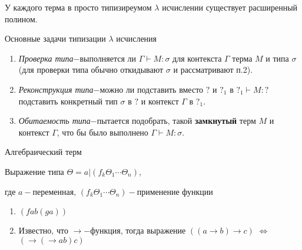 	\begin{theorem}
	У каждого терма в просто типизиреумом $\lambda$ исчислении существует расширенный полином.
	\end{theorem}
		
	\begin{statement}Основные задачи типизации $\lambda$ исчисления\end{statement}
		\begin{enumerate}
			\item \emph{Проверка типа$-$}выполняется ли $\Gamma\vdash M:\sigma$ для контекста $\Gamma\text{ терма }M\text{ и типа }\sigma$ (для проверки типа обычно откидывают $\sigma$ и рассматривают п.2).
			\item \emph{Реконструкция типа$-$}можно ли подставить вместо $?$ и $?_1$ в $?_1\vdash M:?$ подставить конкретный тип $\sigma$ в $?$ и контекст $\Gamma$ в $?_1$.
			\item \emph{Обитаемость типа$-$}пытается подобрать, такой \textbf{замкнутый} терм $M$ и контекст $\Gamma$, что бы было выполнено $\Gamma\vdash M:\sigma$.
		\end{enumerate}			
	\begin{definition}Алгебраический терм\end{definition}Выражение типа $\Theta=a|(f_k \Theta_1\dotsb\Theta_n)$, \par где $a-$переменная, $(f_k \Theta_1\dotsb\Theta_n)-$применение функции\par
	\begin{example}\end{example}
	\begin{enumerate}
	\item $(f a b ( g a))$ 
	\item Известно, что $\to-$функция, тогда выражение $((a\to b)\to c)$ $\Longleftrightarrow$ $(\to (\to a b) c)$
\end{enumerate}		
